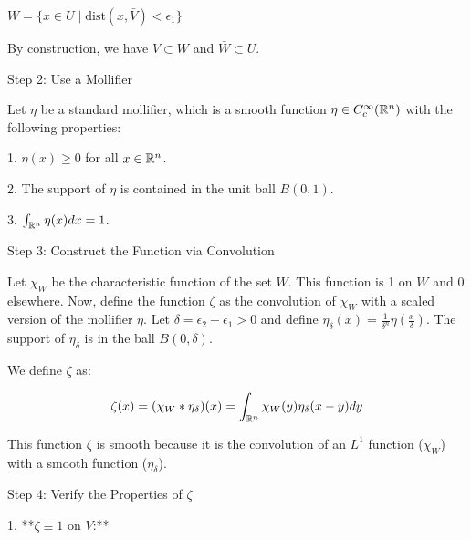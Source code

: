 \documentclass[12pt,a4paper]{report}
\begin{document}
\begin{enumerate}
\begin{description}
\( W = \{x \in U \mid \text{dist}(x, \bar{V}) < \epsilon_1 \} \)

By construction, we have \( V \subset W \) and \( \bar{W} \subset U \).

\item  Step 2: Use a Mollifier

Let \( \eta \) be a standard mollifier, which is a smooth function \( \eta \in C_c^\infty(\mathbb{R}^n) \) with the following properties:
\begin{description}

\item 1.  \( \eta(x) \geq 0 \) for all \( x \in \mathbb{R}^n \).
\item 2.  The support of \( \eta \) is contained in the unit ball \( B(0, 1) \).
\item 3.  \( \int_{\mathbb{R}^n} \eta(x) dx = 1 \).
\end{description}

\item  Step 3: Construct the Function via Convolution

Let \( \chi_W \) be the characteristic function of the set \( W \). This function is 1 on \( W \) and 0 elsewhere. Now, define the function \( \zeta \) as the convolution of \( \chi_W \) with a scaled version of the mollifier \( \eta \). Let \( \delta = \epsilon_2 - \epsilon_1 > 0 \) and define \( \eta_\delta(x) = \frac{1}{\delta^n} \eta(\frac{x}{\delta}) \). The support of \( \eta_\delta \) is in the ball \( B(0, \delta) \).

We define \( \zeta \) as:

$$ \zeta(x) = (\chi_W * \eta_\delta)(x) = \int_{\mathbb{R}^n} \chi_W(y) \eta_\delta(x-y) dy $$

This function \( \zeta \) is smooth because it is the convolution of an \( L^1 \) function (\( \chi_W \)) with a smooth function (\( \eta_\delta \)).

\item Step 4: Verify the Properties of \( \zeta \)

\begin{description}

	\item 1.  **\( \zeta \equiv 1 \) on \( V \):**
	

\end{description}
\end{description}
\end{enumerate}
\end{document}
